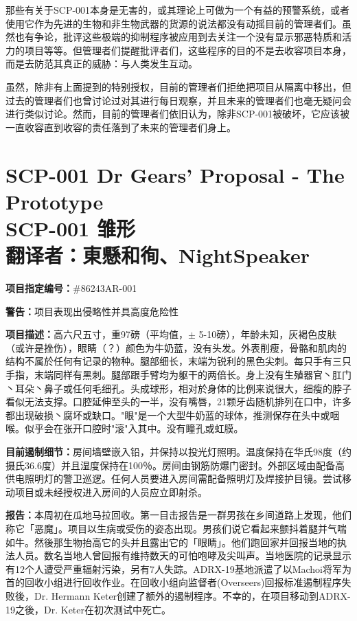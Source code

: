 \documentclass[openany,a4paper]{book} %
\newcounter{mychapter} %
\begin{document}
那些有关于SCP-001本身是无害的，或其理论上可做为一个有益的预警系统，或者使用它作为先进的生物和非生物武器的货源的说法都没有动摇目前的管理者们。虽然也有争论，批评这些极端的抑制程序被应用到去关注一个没有显示邪恶特质和活力的项目等等。但管理者们提醒批评者们，这些程序的目的不是去收容项目本身，而是去防范其真正的威胁：与人类发生互动。\vspace{12pt}

虽然，除非有上面提到的特别授权，目前的管理者们拒绝把项目从隔离中移出，但过去的管理者们也曾讨论过对其进行每日观察，并且未来的管理者们也毫无疑问会进行类似讨论。然而，目前的管理者们依旧认为，除非SCP-001被破坏，它应该被一直收容直到收容的责任落到了未来的管理者们身上。

\addtocounter{mychapter}{1}
\chapter[SCP-001 雏形]{SCP-001 Dr Gears' Proposal - The Prototype \\ SCP-001 雏形 \\ 翻译者：東懸和徇、NightSpeaker}\label{chap:SCP-001-2}

\textbf{项目指定编号：}\#86243AR-001\vspace{12pt}

\textbf{警告：}项目表现出侵略性并具高度危险性\vspace{12pt}

\textbf{项目描述：}高六尺五寸，重97磅（平均值，$\pm$ 5-10磅），年龄未知，灰褐色皮肤（或许是挫伤），眼睛（？）颜色为牛奶蓝，没有头发。外表削瘦，骨骼和肌肉的结构不属於任何有记录的物种。腿部细长，末端为锐利的黑色尖刺。每只手有三只手指，末端同样有黑刺。腿部跟手臂均为躯干的两倍长。身上没有生殖器官丶肛门丶耳朵丶鼻子或任何毛细孔。头成球形，相对於身体的比例来说很大，细瘦的脖子看似无法支撑。口腔延伸至头的一半，没有嘴唇，21颗牙齿随机排列在口中，许多都出现破损丶腐坏或缺口。"眼"是一个大型牛奶蓝的球体，推测保存在头中或咽喉。似乎会在张开口腔时"滚"入其中。没有瞳孔或虹膜。\vspace{12pt}

\textbf{目前遏制细节：}房间墙壁嵌入铅，并保持以投光灯照明。温度保持在华氏98度（约摄氏36.6度）并且湿度保持在100％。房间由钢筋防爆门密封。外部区域由配备高供电照明灯的警卫巡逻。任何人员要进入房间需配备照明灯及焊接护目镜。尝试移动项目或未经授权进入房间的人员应立即射杀。\vspace{12pt}

\textbf{报告：}本周初在瓜地马拉回收。第一目击报告是一群男孩在乡间道路上发现，他们称它「恶魔」。项目以生病或受伤的姿态出现。男孩们说它看起来颤抖着腿并气喘如牛。然後那生物抬高它的头并且露出它的「眼睛」。他们跑回家并回报当地的执法人员。数名当地人曾回报有维持数天的可怕咆哮及尖叫声。当地医院的记录显示有12个人遭受严重辐射污染，另有7人失踪。ADRX-19基地派遣了以Machoi将军为首的回收小组进行回收作业。在回收小组向监督者(Overseers)回报标准遏制程序失败後，Dr. Hermann Keter创建了额外的遏制程序。不幸的，在项目移动到ADRX-19之後，Dr. Keter在初次测试中死亡。\vspace{12pt}
\end{document}
